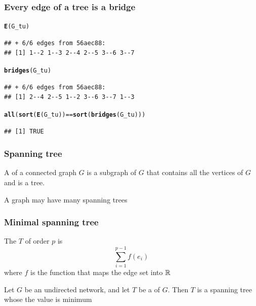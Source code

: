 \documentclass[aspectratio=169]{beamer}\usepackage[]{graphicx}\usepackage[]{xcolor}
\makeatletter
\newcommand{\hlopt}[1]{\textcolor[rgb]{0,0,0}{#1}}%
\newcommand{\hldef}[1]{\textcolor[rgb]{0.345,0.345,0.345}{#1}}%
\newcommand{\hlkwd}[1]{\textcolor[rgb]{0.737,0.353,0.396}{\textbf{#1}}}%
\newenvironment{kframe}{%
 \def\at@end@of@kframe{}%
 \ifinner\ifhmode%
  \def\at@end@of@kframe{\end{minipage}}%
  \begin{minipage}{\columnwidth}%
 \fi\fi%
 \def\FrameCommand##1{\hskip\@totalleftmargin \hskip-\fboxsep
 \colorbox{shadecolor}{##1}\hskip-\fboxsep
     \hskip-\linewidth \hskip-\@totalleftmargin \hskip\columnwidth}%
 \MakeFramed {\advance\hsize-\width
   \@totalleftmargin\z@ \linewidth\hsize
   \@setminipage}}%
 {\par\unskip\endMakeFramed%
 \at@end@of@kframe}
\newenvironment{knitrout}{}{} %
\makeatother
\begin{document}
\begin{frame}[fragile]\frametitle{Every edge of a tree is a bridge}
\begin{knitrout}
\color{fgcolor}\begin{kframe}
\begin{alltt}
\hlkwd{E}\hldef{(G_tu)}
\end{alltt}
\begin{verbatim}
## + 6/6 edges from 56aec88:
## [1] 1--2 1--3 2--4 2--5 3--6 3--7
\end{verbatim}
\begin{alltt}
\hlkwd{bridges}\hldef{(G_tu)}
\end{alltt}
\begin{verbatim}
## + 6/6 edges from 56aec88:
## [1] 2--4 2--5 1--2 3--6 3--7 1--3
\end{verbatim}
\begin{alltt}
\hlkwd{all}\hldef{(}\hlkwd{sort}\hldef{(}\hlkwd{E}\hldef{(G_tu))} \hlopt{==} \hlkwd{sort}\hldef{(}\hlkwd{bridges}\hldef{(G_tu)))}
\end{alltt}
\begin{verbatim}
## [1] TRUE
\end{verbatim}
\end{kframe}
\end{knitrout}
\end{frame}


\begin{frame}\frametitle{Spanning tree}
	\begin{definition}
	A  of a connected graph $G$ is a subgraph of $G$ that contains all the vertices of $G$ and is a tree.
	\end{definition}
	\vfill
	A graph may have many spanning trees
\end{frame}


\begin{frame}\frametitle{Minimal spanning tree}
	\begin{definition}
	The  $T$ of order $p$ is
	$$\sum_{i=1}^{p-1}f(e_i)$$
	where $f$ is the function that maps the edge set into $\mathbb{R}$
	\end{definition}
	\vfill
	\begin{definition}
	Let $G$ be an undirected network, and let $T$ be a  of $G$. Then $T$ is a spanning tree whose the value is minimum
	\end{definition}
\end{frame}
\end{document}
